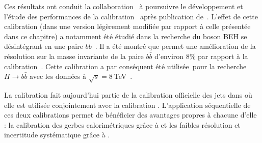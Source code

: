 Ces r\'esultats ont conduit la collaboration \ATLAS~\`a poursuivre le d\'eveloppement et l'\'etude des performances de la calibration~\GS{} apr\`es publication de~\cite{Aad:2011he}. L'effet de cette calibration (dans une version l\'eg\`erement modifi\'ee par rapport \`a celle pr\'esent\'ee dans ce chapitre) a notamment \'et\'e \'etudi\'e dans la recherche du boson BEH se d\'esint\'egrant en une paire $b\bar{b}$~\cite{Aad:1541965}. Il a \'et\'e montr\'e que \GS{} permet une am\'elioration de la r\'esolution sur la masse invariante de la paire $b\bar{b}$ d'environ 8\% par rapport \`a la calibration~\EMJES. Cette calibration a par cons\'equent \'et\'e utilis\'ee~pour la recherche $H\rightarrow b\bar{b}$ avec les donn\'ees \`a $\sqrt{s}=8~$TeV~\cite{Aad:2014xzb}. 

La calibration \GS{} fait aujourd'hui partie de la calibration officielle des jets dans \ATLAS{} o\`u elle est utilis\'ee conjointement avec la calibration \LCW. L'application s\'equentielle de ces deux calibrations permet de b\'en\'eficier des avantages propres \`a chacune d'elle : la calibration des gerbes calorim\'etriques gr\^ace \`a \LCW{} et les faibles r\'esolution et incertitude syst\'ematique gr\^ace \`a \GS.















